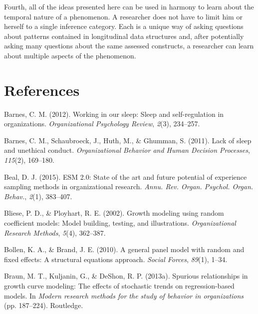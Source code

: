\documentclass[english,,man]{apa6}
\begin{document}
Fourth, all of the ideas presented here can be used in harmony to learn about the temporal nature of a phenomenon. A researcher does not have to limit him or herself to a single inference category. Each is a unique way of asking questions about patterns contained in longitudinal data structures and, after potentially asking many questions about the same assessed constructs, a researcher can learn about multiple aspects of the phenomenon.

\newpage

\hypertarget{references}{%
\section{References}\label{references}}

\setlength{\parindent}{-0.5in}
\setlength{\leftskip}{0.5in}

\hypertarget{refs}{}
\leavevmode\hypertarget{ref-barnes2012working}{}%
Barnes, C. M. (2012). Working in our sleep: Sleep and self-regulation in organizations. \emph{Organizational Psychology Review}, \emph{2}(3), 234--257.

\leavevmode\hypertarget{ref-barnes_lack_2011}{}%
Barnes, C. M., Schaubroeck, J., Huth, M., \& Ghumman, S. (2011). Lack of sleep and unethical conduct. \emph{Organizational Behavior and Human Decision Processes}, \emph{115}(2), 169--180.

\leavevmode\hypertarget{ref-beal_esm_2015}{}%
Beal, D. J. (2015). ESM 2.0: State of the art and future potential of experience sampling methods in organizational research. \emph{Annu. Rev. Organ. Psychol. Organ. Behav.}, \emph{2}(1), 383--407.

\leavevmode\hypertarget{ref-bliese_growth_2002}{}%
Bliese, P. D., \& Ployhart, R. E. (2002). Growth modeling using random coefficient models: Model building, testing, and illustrations. \emph{Organizational Research Methods}, \emph{5}(4), 362--387.

\leavevmode\hypertarget{ref-bollen_general_2010}{}%
Bollen, K. A., \& Brand, J. E. (2010). A general panel model with random and fixed effects: A structural equations approach. \emph{Social Forces}, \emph{89}(1), 1--34.

\leavevmode\hypertarget{ref-braun2013spurious}{}%
Braun, M. T., Kuljanin, G., \& DeShon, R. P. (2013a). Spurious relationships in growth curve modeling: The effects of stochastic trends on regression-based models. In \emph{Modern research methods for the study of behavior in organizations} (pp. 187--224). Routledge.
\end{document}
